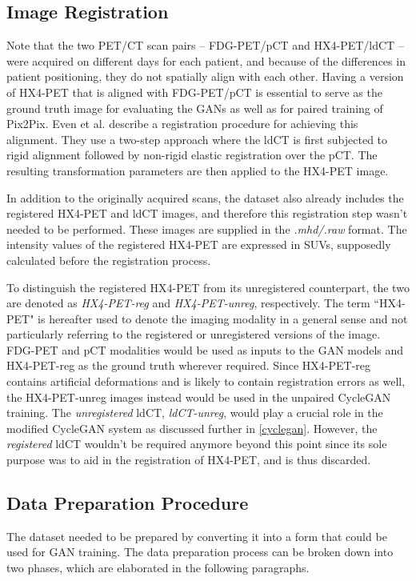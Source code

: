 \subsection{Image Registration}
Note that the two PET/CT scan pairs -- FDG-PET/pCT and HX4-PET/ldCT -- were acquired on different days for each patient, and because of the differences in patient positioning, they do not spatially align with each other. Having a version of HX4-PET that is aligned with FDG-PET/pCT is essential to serve as the ground truth image for evaluating the GANs as well as for paired training of Pix2Pix. Even et al. \cite{even2017predicting} describe a registration procedure for achieving this alignment. They use a two-step approach where the ldCT is first subjected to rigid alignment followed by non-rigid elastic registration over the pCT. The resulting transformation parameters are then applied to the HX4-PET image.

In addition to the originally acquired scans, the dataset also already includes the registered HX4-PET and ldCT images, and therefore this registration step wasn't needed to be performed. These images are supplied in the \textit{.mhd/.raw} format. The intensity values of the registered HX4-PET are expressed in SUVs, supposedly calculated before the registration process. 

To distinguish the registered HX4-PET from its unregistered counterpart, the two are denoted as \textit{HX4-PET-reg} and \textit{HX4-PET-unreg}, respectively. The term ``HX4-PET" is hereafter used to denote the imaging modality in a general sense and not particularly referring to the registered or unregistered versions of the image. FDG-PET and pCT modalities would be used as inputs to the GAN models and HX4-PET-reg as the ground truth wherever required. Since HX4-PET-reg contains artificial deformations and is likely to contain registration errors as well, the HX4-PET-unreg images instead would be used in the unpaired CycleGAN training. The \textit{unregistered} ldCT, \textit{ldCT-unreg}, would play a crucial role in the modified CycleGAN system as discussed further in \ref{cyclegan}. However, the \textit{registered} ldCT wouldn't be required anymore beyond this point since its sole purpose was to aid in the registration of HX4-PET, and is thus discarded.


\subsection{Data Preparation Procedure}
\label{Data_Processing}
The dataset needed to be prepared by converting it into a form that could be used for GAN training. The data preparation process can be broken down into two phases, which are elaborated in the following paragraphs. 


